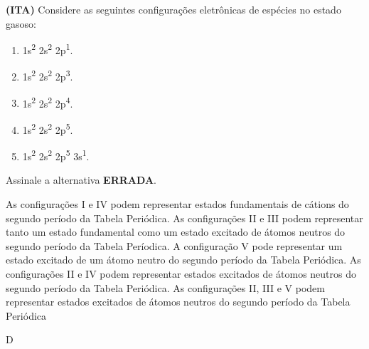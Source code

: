 \documentclass[9 pt]{scrartcl}
\def\PQ{0.84} %
\begin{document}
\begin{exercise}[points=\PQ]
\textbf{(ITA)} Considere as seguintes configurações
eletrônicas de espécies no estado gasoso:
\begin{enumerate}[label=\Roman*]
\item 1s\textsuperscript{2} 2s\textsuperscript{2} 2p\textsuperscript{1}.
\item 1s\textsuperscript{2} 2s\textsuperscript{2} 2p\textsuperscript{3}.
\item 1s\textsuperscript{2} 2s\textsuperscript{2} 2p\textsuperscript{4}.
\item 1s\textsuperscript{2} 2s\textsuperscript{2} 2p\textsuperscript{5}.
\item 1s\textsuperscript{2} 2s\textsuperscript{2} 2p\textsuperscript{5} 3s\textsuperscript{1}.
\end{enumerate}

Assinale a alternativa \textbf{ERRADA}.

\begin{choice}
\choice As configurações I e IV podem representar estados
fundamentais de cátions do segundo período da Tabela
Periódica.
\choice As configurações II e III podem representar tanto um
estado fundamental como um estado excitado de átomos
neutros do segundo período da Tabela Períodica.
\choice A configuração V pode representar um estado excitado
de um átomo neutro do segundo período da Tabela
Periódica.
\choice As configurações II e IV podem representar estados
excitados de átomos neutros do segundo período da Tabela
Periódica.
\choice As configurações II, III e V podem representar estados
excitados de átomos neutros do segundo período da Tabela Periódica
\end{choice}
\end{exercise}
\begin{solution}
D
\end{solution}











\end{document}
